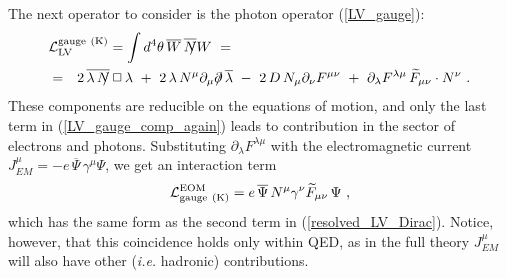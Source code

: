 \documentclass[12pt]{revtex4}
\newcommand{\slashed}[1]{\hbox{{$#1$}\llap{$/$}}}
\begin{document}
The next operator to consider is the photon operator
(\ref{LV_gauge}):
\begin{eqnarray}
\label{LV_gauge_comp_again}
\lefteqn{
\mathcal{L}_{\mathrm{LV}}^{\mathrm{gauge\ (K)}} =  
\int d^4\theta \, \overline{W}\, \overline{\slashed{N}}W ~=~
} \\
\nonumber
& = &
2\, \overline{\lambda\,\slashed{N}}\, \Box\, 
   \lambda 
~+~
2\, \lambda\, N^\mu \partial_\mu \slashed{\partial}\, 
   \overline{\lambda} 
~-~ 
2\, D\, N_\mu \partial_\nu F^{\mu\nu}
~+~ 
\partial_\lambda F^{\lambda\mu}\, 
\widetilde{F}_{\mu\nu} \cdot N^\nu
~.
\end{eqnarray}
These components are reducible on the equations of motion, 
and only the last term in (\ref{LV_gauge_comp_again})
leads to contribution in the sector of electrons and photons. 
Substituting $ \partial_\lambda F^{\lambda\mu} $ 
with the electromagnetic current 
$ J_{EM}^\mu=- e\, \overline{\Psi}\, \gamma^\mu \Psi $,
we get an interaction term
\begin{equation}
\label{LV_induced_by_gauge_K}
        \mathcal{L}_{\rm gauge\ (K)}^{\rm EOM} = 
 e\, \overline{\Psi}\, N^\mu \gamma^\nu
\widetilde{F}_{\mu\nu}\, \Psi~,
\end{equation}
which  has the same form as the second term in (\ref{resolved_LV_Dirac}).
Notice, however, that this coincidence holds only within QED, 
as in the full theory $J_{EM}^\mu$ will also have other 
({\em i.e.} hadronic) contributions. 
\end{document}
